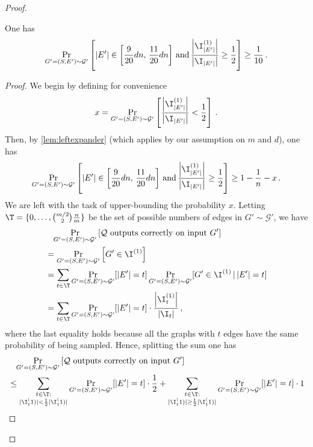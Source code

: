\begin{proof}
	\begin{claim}
		\label{claim:conditionlargeprob}
		One has
		\begin{equation*}
			\Pr_{G'=(S,E') \sim \mathcal{G}'}\left[  |E'| \in \left[\frac{9}{20}dn , \, \frac{11}{20}dn\right]  \, \mathrm{ and } \, \frac{\left|\I_{|E'|}^{(1)}\right|}{\left|\I_{|E'| }\right|} \ge  \frac{1}{2}\right] \ge \frac{1}{10} \, .
		\end{equation*}
	\end{claim}
	\begin{proof}
		We begin by defining for convenience
		\begin{equation*}
			x  = \Pr_{G'=(S,E') \sim \mathcal{G}'}\left[  \frac{\left|\I_{|E'|}^{(1)}\right|}{\left|\I_{|E'| }\right|} < \frac{1}{2}\right]  \, .
		\end{equation*}
		Then, by \cref{lem:leftexpander} (which applies by our assumption on $m$ and $d$), one has
		 \begin{equation}
		 	\label{eq:unionbound}
		 		\Pr_{G'=(S,E') \sim \mathcal{G}'}\left[  |E'| \in \left[\frac{9}{20}dn , \, \frac{11}{20}dn\right]  \, \mathrm{ and } \, \frac{\left|\I_{|E'|}^{(1)}\right|}{\left|\I_{|E'| }\right|} \ge  \frac{1}{2}\right]  \ge 1-\frac{1}{n} - x\, .
		 \end{equation}
		 We are left with the task of upper-bounding the probability $x$. Letting $\T = \{0, \dots, \binom{m/2}{2} \frac{n}{m}\}$ be  the set of possible numbers of edges in $G' \sim \mathcal{G}'$, we have
		 \begin{align*}
		 	& \hphantom{=} \Pr_{G'=(S,E') \sim \mathcal{G}'}\left[\mathcal{Q} \text{ outputs correctly on input } G'\right]\\
		 	& = \Pr_{G'=(S,E') \sim \mathcal{G}'}\left[G' \in \I^{(1)}\right] \\
		 	& =\sum_{t \in \T} \Pr_{G'=(S,E') \sim \mathcal{G}'}[|E'|=t] \Pr_{G'=(S,E') \sim \mathcal{G}'}[G' \in \I^{(1)} \, | \, |E'|=t] \\
		 	& = \sum_{t \in \T}\Pr_{G'=(S,E') \sim \mathcal{G}'}[|E'|=t]  \cdot \frac{\left|\I_{t}^{(1)}\right|}{\left|\I_{t}\right|} \, ,
		\end{align*}
		where the last equality holds because all the graphs with $t$  edges have the same probability of being sampled. Hence, splitting the sum one has
		\begin{align*}
			& \hphantom{=} \Pr_{G'=(S,E') \sim \mathcal{G}'}\left[\mathcal{Q} \text{ outputs correctly on input } G'\right]\\
		 	& \le \sum_{\substack{t \in \T : \\ |\I_t^(1)| < \frac{1}{2}|\I_t^(1)| }}  \Pr_{G'=(S,E') \sim \mathcal{G}'}[|E'|=t] \cdot \frac{1}{2} + \sum_{\substack{t \in \T : \\ |\I_t^(1)| \ge \frac{1}{2}|\I_t^(1)| }} \Pr_{G'=(S,E') \sim \mathcal{G}'}[|E'|=t]\cdot 1\\

\end{align*}
\end{proof}
\end{proof}
